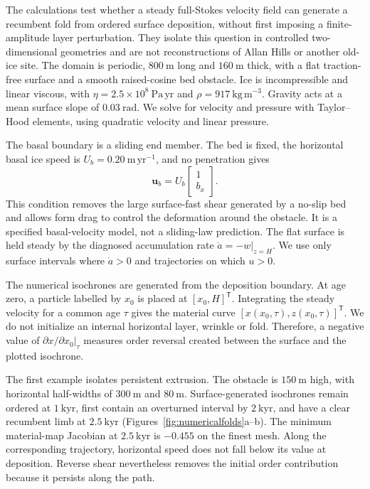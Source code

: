 \documentclass[review]{igs}
\theoremstyle{definition}
\theoremstyle{remark}
\newcommand{\uvec}{\bm{u}}
\begin{document}
The calculations test whether a steady full-Stokes velocity field can generate a recumbent fold from ordered surface deposition, without first imposing a finite-amplitude layer perturbation. They isolate this question in controlled two-dimensional geometries and are not reconstructions of Allan Hills or another old-ice site. The domain is periodic, \(800~\mathrm{m}\) long and \(160~\mathrm{m}\) thick, with a flat traction-free surface and a smooth raised-cosine bed obstacle. Ice is incompressible and linear viscous, with \(\eta=2.5\times10^8~\mathrm{Pa\,yr}\) and \(\rho=917~\mathrm{kg\,m^{-3}}\). Gravity acts at a mean surface slope of \(0.03~\mathrm{rad}\). We solve for velocity and pressure with Taylor--Hood elements, using quadratic velocity and linear pressure.

The basal boundary is a sliding end member. The bed is fixed, the horizontal basal ice speed is \(U_b=0.20~\mathrm{m\,yr^{-1}}\), and no penetration gives
\begin{equation}
\uvec_b
=U_b
\begin{bmatrix}
1\\
b_x
\end{bmatrix}.
\label{eq:numericalsliding}
\end{equation}
This condition removes the large surface-fast shear generated by a no-slip bed and allows form drag to control the deformation around the obstacle. It is a specified basal-velocity model, not a sliding-law prediction. The flat surface is held steady by the diagnosed accumulation rate \(\dot a=-w\big|_{z=H}\). We use only surface intervals where \(\dot a>0\) and trajectories on which \(u>0\).

The numerical isochrones are generated from the deposition boundary. At age zero, a particle labelled by \(x_0\) is placed at \([x_0,H]^{\mathsf T}\). Integrating the steady velocity for a common age \(\tau\) gives the material curve \([x(x_0,\tau),z(x_0,\tau)]^{\mathsf T}\). We do not initialize an internal horizontal layer, wrinkle or fold. Therefore, a negative value of \(\partial x/\partial x_0|_\tau\) measures order reversal created between the surface and the plotted isochrone.

The first example isolates persistent extrusion. The obstacle is \(150~\mathrm{m}\) high, with horizontal half-widths of \(300~\mathrm{m}\) and \(80~\mathrm{m}\). Surface-generated isochrones remain ordered at \(1~\mathrm{kyr}\), first contain an overturned interval by \(2~\mathrm{kyr}\), and have a clear recumbent limb at \(2.5~\mathrm{kyr}\) (Figures~\ref{fig:numericalfolds}a--b). The minimum material-map Jacobian at \(2.5~\mathrm{kyr}\) is \(-0.455\) on the finest mesh. Along the corresponding trajectory, horizontal speed does not fall below its value at deposition. Reverse shear nevertheless removes the initial order contribution because it persists along the path.
\end{document}

